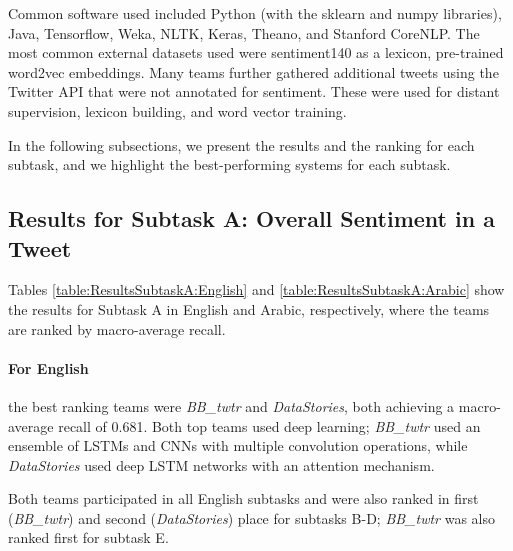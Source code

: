 \documentclass[11pt,a4paper]{article}
\begin{document}
Common software used included Python (with the sklearn and numpy libraries), Java, Tensorflow, Weka, NLTK, Keras, Theano, and Stanford CoreNLP. The most common external datasets used were sentiment140 as a lexicon, pre-trained word2vec embeddings. Many teams further gathered additional tweets using the Twitter API that were not annotated for sentiment. These were used for distant supervision, lexicon building, and word vector training.

In the following subsections, we present the results and the ranking for each subtask, and we highlight the best-performing systems for each subtask.




\subsection{Results for Subtask A: Overall Sentiment in a Tweet}

Tables \ref{table:ResultsSubtaskA:English} and \ref{table:ResultsSubtaskA:Arabic} show the results for Subtask A in English and Arabic, respectively, where the teams are ranked by macro-average recall.

\paragraph{For English} the best ranking teams were \emph{BB\_twtr} and \emph{DataStories}, both achieving a macro-average recall of 0.681.
Both top teams used deep learning;  \emph{BB\_twtr} used an ensemble of LSTMs and CNNs with multiple convolution operations, while \emph{DataStories} used deep LSTM networks with an attention mechanism.

Both teams participated in all English subtasks and were also ranked in first (\emph{BB\_twtr}) and second (\emph{DataStories}) place for subtasks B-D; \emph{BB\_twtr} was also ranked first for subtask E.
\end{document}

